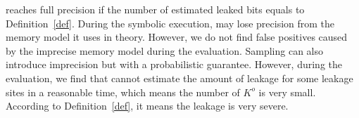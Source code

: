 \tool{} reaches full precision if the number of estimated leaked bits 
equals to Definition~\ref{def}. 
During the symbolic execution, \tool{} may lose precision from the 
memory model it uses in theory. However, we do not find false positives 
caused by the imprecise memory model during the evaluation. 
Sampling can also introduce imprecision but with a probabilistic guarantee. 
However, during the evaluation, we find that \tool{} cannot estimate 
the amount of leakage for some leakage sites in a reasonable time, 
which means the number of $K^o$ is very small. According to Definition~\ref{def}, 
it means the leakage is very severe.

